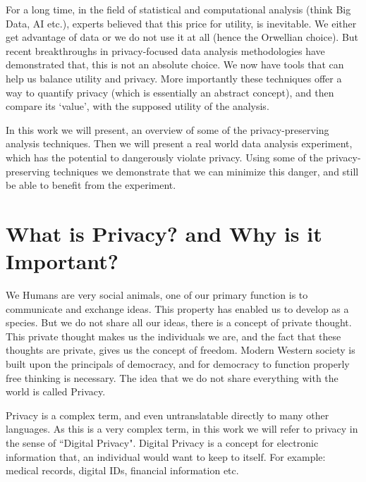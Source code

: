 \documentclass[12pt]{report}
\theoremstyle{named}
\begin{document}
For a long time, in the field of statistical and computational analysis (think Big Data, AI etc.), experts believed that this price for utility, is inevitable. We either get advantage of data or we do not use it at all (hence the Orwellian choice). But recent breakthroughs in privacy-focused data analysis methodologies have demonstrated that, this is not an absolute choice. We now have tools that can help us balance utility and privacy. More importantly these techniques offer a way to quantify privacy (which is essentially an abstract concept), and then compare its `value', with the supposed utility of the analysis.

In this work we will present, an overview of some of the privacy-preserving analysis techniques. Then we will present a real world data analysis experiment, which has the potential to dangerously violate privacy. Using some of the privacy-preserving techniques we demonstrate that we can minimize this danger, and still be able to benefit from the experiment.


\section{What is Privacy? and Why is it Important?}
We Humans are very social animals, one of our primary function is to communicate and exchange ideas. This property has enabled us to develop as a species. But we do not share all our ideas, there is a concept of private thought. This private thought makes us the individuals we are, and the fact that these thoughts are private, gives us the concept of freedom. Modern Western society is built upon the principals of democracy, and for democracy to function properly free thinking is necessary. The idea that we do not share everything with the world is called Privacy. 

Privacy is a complex term, and even untranslatable directly to many other languages. As this is a very complex term, in this work we will refer to privacy in the sense of ``Digital Privacy". Digital Privacy is a concept for electronic information that, an individual would want to keep to itself.  For example: medical records, digital IDs, financial information etc. 




\end{document}
